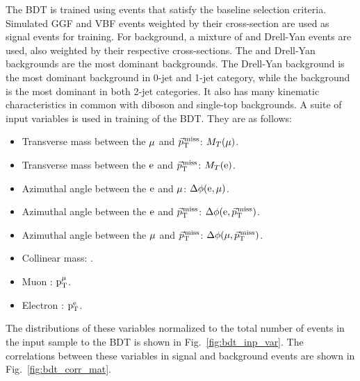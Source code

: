The BDT is trained using events that satisfy the baseline selection criteria. Simulated GGF and VBF events weighted by their cross-section are used as signal events for training. For background, a mixture of \ttb and Drell-Yan events are used, also weighted by their respective cross-sections. The \ttb and Drell-Yan backgrounds are the most dominant backgrounds. The Drell-Yan background is the most dominant background in 0-jet and 1-jet category, while the \ttb background is the most dominant in both 2-jet categories. It also has many kinematic characteristics in common with diboson and single-top backgrounds. A suite of input variables is used in training of the BDT. They are as follows:
\begin{itemize}
\item Transverse mass between the $\mu$ and ${\vec p}_{\mathrm{T}}^{\kern1pt\text{miss}}$: $M_T(\mu)$.
\item Transverse mass between the $\text{e}$ and ${\vec p}_{\mathrm{T}}^{\kern1pt\text{miss}}$: $M_T(\text{e})$. 
\item Azimuthal angle between the $\text{e}$ and $\mu$: $\Delta\phi(\text{e}, \mu)$. 
\item Azimuthal angle between the $\text{e}$ and ${\vec p}_{\mathrm{T}}^{\kern1pt\text{miss}}$: $\Delta\phi(\text{e}, {\vec p}_{\mathrm{T}}^{\kern1pt\text{miss}})$.
\item Azimuthal angle between the $\mu$ and ${\vec p}_{\mathrm{T}}^{\kern1pt\text{miss}}$: $\Delta\phi(\mu, {\vec p}_{\mathrm{T}}^{\kern1pt\text{miss}})$. 
\item Collinear mass: \mcol.
\item Muon \pt: $\text{p}_\text{T}^{\mu}$. 
\item Electron \pt: $\text{p}_\text{T}^{\text{e}}$.
\end{itemize}
The distributions of these variables normalized to the total number of events in the input sample to the BDT is shown in Fig.~\ref{fig:bdt_inp_var}. The correlations between these variables in signal and background events are shown in Fig.~\ref{fig:bdt_corr_mat}.
